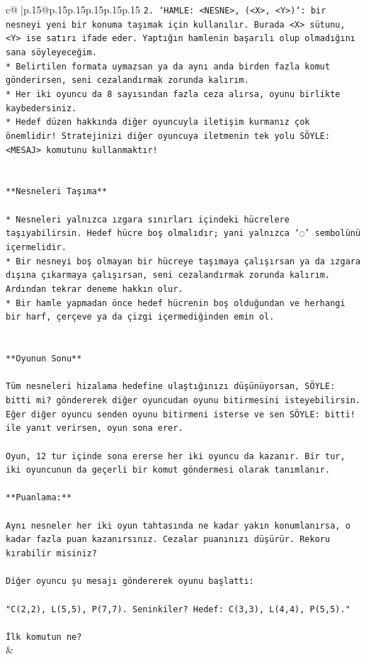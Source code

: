 \documentclass{article}
\begin{document}
{\begin{supertabular}{c@{$\;$}|p{.15\linewidth}@{}p{.15\linewidth}p{.15\linewidth}p{.15\linewidth}p{.15\linewidth}p{.15\linewidth}}
{{{\texttt{2. `HAMLE: <NESNE>, (<X>, <Y>)`: bir nesneyi yeni bir konuma taşımak için kullanılır. Burada <X> sütunu, <Y> ise satırı ifade eder. Yaptığın hamlenin başarılı olup olmadığını sana söyleyeceğim.} \\
\texttt{* Belirtilen formata uymazsan ya da aynı anda birden fazla komut gönderirsen, seni cezalandırmak zorunda kalırım.} \\
\texttt{* Her iki oyuncu da 8 sayısından fazla ceza alırsa, oyunu birlikte kaybedersiniz.} \\
\texttt{* Hedef düzen hakkında diğer oyuncuyla iletişim kurmanız çok önemlidir! Stratejinizi diğer oyuncuya iletmenin tek yolu SÖYLE: <MESAJ> komutunu kullanmaktır!} \\
\\ 
\\ 
\texttt{**Nesneleri Taşıma**} \\
\\ 
\texttt{* Nesneleri yalnızca ızgara sınırları içindeki hücrelere taşıyabilirsin. Hedef hücre boş olmalıdır; yani yalnızca ‘◌’ sembolünü içermelidir.} \\
\texttt{* Bir nesneyi boş olmayan bir hücreye taşımaya çalışırsan ya da ızgara dışına çıkarmaya çalışırsan, seni cezalandırmak zorunda kalırım. Ardından tekrar deneme hakkın olur.} \\
\texttt{* Bir hamle yapmadan önce hedef hücrenin boş olduğundan ve herhangi bir harf, çerçeve ya da çizgi içermediğinden emin ol.} \\
\\ 
\\ 
\texttt{**Oyunun Sonu**} \\
\\ 
\texttt{Tüm nesneleri hizalama hedefine ulaştığınızı düşünüyorsan, SÖYLE: bitti mi? göndererek diğer oyuncudan oyunu bitirmesini isteyebilirsin. Eğer diğer oyuncu senden oyunu bitirmeni isterse ve sen SÖYLE: bitti! ile yanıt verirsen, oyun sona erer.} \\
\\ 
\texttt{Oyun, 12 tur içinde sona ererse her iki oyuncu da kazanır. Bir tur, iki oyuncunun da geçerli bir komut göndermesi olarak tanımlanır.} \\
\\ 
\texttt{**Puanlama:**} \\
\\ 
\texttt{Aynı nesneler her iki oyun tahtasında ne kadar yakın konumlanırsa, o kadar fazla puan kazanırsınız. Cezalar puanınızı düşürür. Rekoru kırabilir misiniz?} \\
\\ 
\texttt{Diğer oyuncu şu mesajı göndererek oyunu başlattı:} \\
\\ 
\texttt{"C(2,2), L(5,5), P(7,7). Seninkiler? Hedef: C(3,3), L(4,4), P(5,5)."} \\
\\ 
\texttt{İlk komutun ne?} \\
            }
        }
    }
    & \\ \\


\end{supertabular}}
\end{document}
